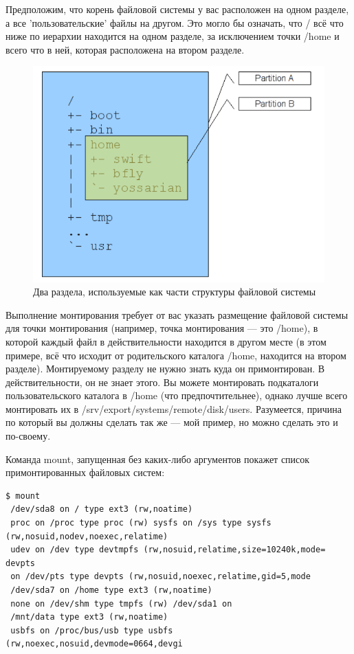 \documentclass[10pt]{book}
\begin{document}
Предположим, что корень файловой системы у вас расположен на одном разделе, а все 'пользовательские' файлы на другом. Это могло бы означать, что / всё что ниже по иерархии находится на одном разделе, за исключением точки /home и всего что в ней, которая расположена на втором разделе.

\begin{figure}[!t]
\centering
\includegraphics[scale=0.6]{scrn2}
\caption{Два раздела, используемые как части структуры файловой системы}
\end{figure}

Выполнение монтирования требует от вас указать размещение файловой системы для точки монтирования (например, точка монтирования — это /home), в которой каждый файл в действительности находится в другом месте (в этом примере, всё что исходит от родительского каталога /home, находится на втором разделе).  Монтируемому разделу не нужно знать куда он примонтирован. В действительности, он не знает этого. Вы можете монтировать подкаталоги пользовательского каталога в /home (что предпочтительнее), однако лучше всего монтировать их в  /srv/export/systems/remote/disk/users. Разумеется, причина по который вы должны сделать так же — мой пример, но можно сделать это и по-своему.

Команда mount, запущенная без каких-либо аргументов покажет список примонтированных файловых систем: 

\vspace{3mm}
\begin{tcolorbox}
\begin{lstlisting}
$ mount
 /dev/sda8 on / type ext3 (rw,noatime)
 proc on /proc type proc (rw) sysfs on /sys type sysfs (rw,nosuid,nodev,noexec,relatime)
 udev on /dev type devtmpfs (rw,nosuid,relatime,size=10240k,mode= devpts
 on /dev/pts type devpts (rw,nosuid,noexec,relatime,gid=5,mode 
 /dev/sda7 on /home type ext3 (rw,noatime) 
 none on /dev/shm type tmpfs (rw) /dev/sda1 on
 /mnt/data type ext3 (rw,noatime) 
 usbfs on /proc/bus/usb type usbfs (rw,noexec,nosuid,devmode=0664,devgi
\end{lstlisting}
\end{tcolorbox}
\end{document}
